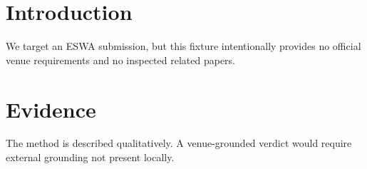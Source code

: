\section{Introduction}
We target an ESWA submission, but this fixture intentionally provides no official venue requirements and no inspected related papers.

\section{Evidence}
The method is described qualitatively. A venue-grounded verdict would require external grounding not present locally.
